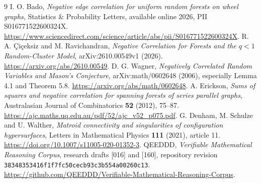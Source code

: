 \documentclass[11pt]{article}
\begin{document}
\begin{thebibliography}{9}
 I. O. Bado, \emph{Negative edge correlation for uniform random forests on wheel graphs}, Statistics \& Probability Letters, available online 2026, PII S016771522600324X. \url{https://www.sciencedirect.com/science/article/abs/pii/S016771522600324X}.
 R. A. \c{C}i\c{c}eksiz and M. Ravichandran, \emph{Negative Correlation for Forests and the $q<1$ Random-Cluster Model}, arXiv:2610.00549v1 (2026). \url{https://arxiv.org/abs/2610.00549}.
 D. G. Wagner, \emph{Negatively Correlated Random Variables and Mason's Conjecture}, arXiv:math/0602648 (2006), especially Lemma 4.1 and Theorem 5.8. \url{https://arxiv.org/abs/math/0602648}.
 A. Erickson, \emph{Sums of squares and negative correlation for spanning forests of series parallel graphs}, Australasian Journal of Combinatorics \textbf{52} (2012), 75--87. \url{https://ajc.maths.uq.edu.au/pdf/52/ajc_v52_p075.pdf}.
 G. Denham, M. Schulze and U. Walther, \emph{Matroid connectivity and singularities of configuration hypersurfaces}, Letters in Mathematical Physics \textbf{111} (2021), article 11. \url{https://doi.org/10.1007/s11005-020-01352-3}.
 QEEDDD, \emph{Verifiable Mathematical Reasoning Corpus}, research drafts [016] and [160], repository revision \texttt{38348353416f1f7fc50cecb93c3b554a00260c13}. \url{https://github.com/QEEDDD/Verifiable-Mathematical-Reasoning-Corpus}.
\end{thebibliography}
\end{document}
